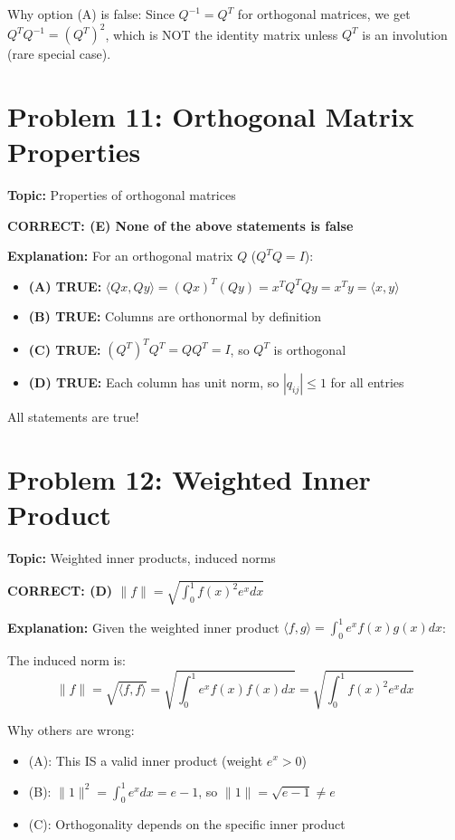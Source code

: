 \documentclass[12pt]{amsart}
\newcommand{\correct}[1]{{\color{blue}\textbf{CORRECT: #1}}}
\begin{document}
Why option (A) is false: Since $Q^{-1} = Q^T$ for orthogonal matrices, we get $Q^TQ^{-1} = (Q^T)^2$, which is NOT the identity matrix unless $Q^T$ is an involution (rare special case).

\hrulefill

\section*{Problem 11: Orthogonal Matrix Properties}
\textbf{Topic:} Properties of orthogonal matrices

\correct{(E) None of the above statements is false}

\textbf{Explanation:} 
For an orthogonal matrix $Q$ ($Q^TQ = I$):
\begin{itemize}
\item \textbf{(A) TRUE:} $\langle Qx, Qy \rangle = (Qx)^T(Qy) = x^TQ^TQy = x^Ty = \langle x, y \rangle$
\item \textbf{(B) TRUE:} Columns are orthonormal by definition
\item \textbf{(C) TRUE:} $(Q^T)^TQ^T = QQ^T = I$, so $Q^T$ is orthogonal
\item \textbf{(D) TRUE:} Each column has unit norm, so $|q_{ij}| \leq 1$ for all entries
\end{itemize}

All statements are true!

\hrulefill

\section*{Problem 12: Weighted Inner Product}
\textbf{Topic:} Weighted inner products, induced norms

\correct{(D) $\|f\| = \sqrt{\int_0^1 f(x)^2 e^x dx}$}

\textbf{Explanation:} 
Given the weighted inner product $\langle f, g \rangle = \int_0^1 e^x f(x)g(x) dx$:

The induced norm is:
$$\|f\| = \sqrt{\langle f, f \rangle} = \sqrt{\int_0^1 e^x f(x)f(x) dx} = \sqrt{\int_0^1 f(x)^2 e^x dx}$$

Why others are wrong:
\begin{itemize}
\item (A): This IS a valid inner product (weight $e^x > 0$)
\item (B): $\|1\|^2 = \int_0^1 e^x dx = e - 1$, so $\|1\| = \sqrt{e-1} \neq e$
\item (C): Orthogonality depends on the specific inner product
\end{itemize}
\end{document}

